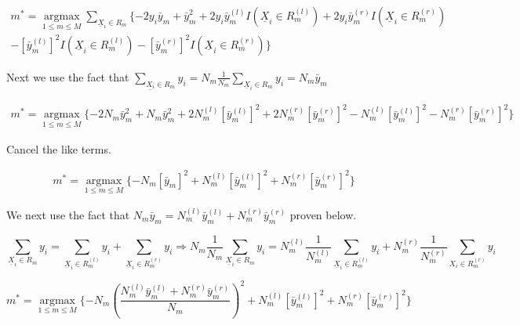 \documentclass[11pt]{article}
\begin{document}
\begin{equation}
\begin{split}
m^* = \underset{1 \leq m \leq M}{\operatorname{argmax}} \sum_{\underline{X}_i \in R_m} \{-2y_i\bar{y}_m + \bar{y}_m^2 + 2y_i\bar{y}_m^{(l)}I(\underline{X}_i \in R_m^{(l)}) + 2y_i\bar{y}_m^{(r)}I(\underline{X}_i \in R_m^{(r)})\\ - [\bar{y}_m^{(l)}]^2I(\underline{X}_i \in R_m^{(l)}) - [\bar{y}_m^{(r)}]^2I(\underline{X}_i \in R_m^{(r)})\}
\end{split}
\end{equation}

Next we use the fact that $\sum_{\underline{X_i} \in R_m} y_i = N_m\frac{1}{N_m} \sum_{\underline{X}_i \in R_m}y_i = N_m \bar{y}_m$

\begin{equation}
\begin{split}
m^* = \underset{1 \leq m \leq M}{\operatorname{argmax}} \{-2N_m\bar{y}_m^2 +N_m\bar{y}_m^2 + 2N_m^{(l)}[\bar{y}_m^{(l)}]^2 + 2N_m^{(r)}[\bar{y}_m^{(r)}]^2  -N_m^{(l)}[\bar{y}_m^{(l)}]^2 -N_m^{(r)}[\bar{y}_m^{(r)}]^2\}
\end{split}
\end{equation}

Cancel the like terms. 

\begin {equation}
\begin{split}
m^* = \underset{1 \leq m \leq M}{\operatorname{argmax}} \{-N_m[\bar{y}_m]^2 + N_m^{(l)}[\bar{y}_m^{(l)}]^2 +N_m^{(r)}[\bar{y}_m^{(r)}]^2\}
\end{split}
\end{equation}

We next use the fact that $N_m\bar{y}_m = N_m^{(l)}\bar{y}_m^{(l)} + N_m^{(r)}\bar{y}_m^{(r)}$ proven below.

$$ \sum_{\underline{X}_i \in R_m} y_i = \sum_{\underline{X}_i \in R_m^{(l)}}y_i + \sum_{\underline{X}_i \in R_m^{(r)}} y_i \Rightarrow N_m \frac{1}{N_m} \sum_{\underline{X}_i \in R_m}y_i = N_m^{(l)}\frac{1}{N_m^{(l)}} \sum_{\underline{X}_i \in R_m^{(l)}}y_i + N_m^{(r)}\frac{1}{N_m^{(r)}}\sum_{X_i \in R_m^{(r)}}y_i $$

\begin {equation}
m^* = \underset{1 \leq m \leq M}{\operatorname{argmax}} \{ -N_m ( \frac{N_m^{(l)}\bar{y}_m^{(l)} + N_m^{(r)}\bar{y}_m^{(r)}}{N_m})^2 + N_m^{(l)}[\bar{y}_m^{(l)}]^2 + N_m^{(r)}[\bar{y}_m^{(r)}]^2\}
\end{equation}
\end{document}
